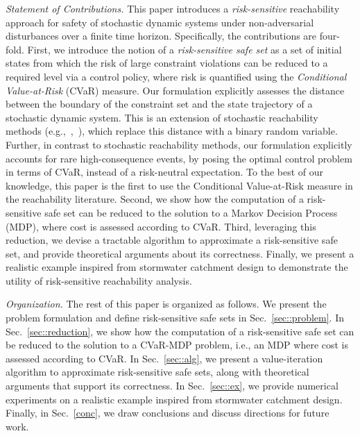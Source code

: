 \documentclass[letterpaper, 10 pt, conference]{ieeeconf}  %
\begin{document}
{\em Statement of Contributions.} This paper introduces a {\em risk-sensitive} reachability approach for safety of stochastic dynamic systems under non-adversarial disturbances
over a finite time horizon. Specifically, the contributions are four-fold. 
First, we introduce the notion of a \textit{risk-sensitive safe set} as a set of initial states 
from which the risk of large constraint violations can be reduced to a required level via a control policy, 
where risk is quantified using the \textit{Conditional Value-at-Risk} (CVaR) measure. 
Our formulation explicitly assesses the distance between the boundary of the constraint set and the
state trajectory of a stochastic dynamic system. This is an extension of stochastic 
reachability methods (e.g.,~\cite{abate2008probabilistic},~\cite{summers2010verification}), which replace this distance with a binary random variable.
Further, in contrast to stochastic reachability methods, our formulation explicitly accounts for rare high-consequence events, by posing the optimal control problem
in terms of CVaR, instead of a risk-neutral expectation. 
To the best of our knowledge, this paper is the first to use the Conditional Value-at-Risk measure in the reachability literature.
Second, we show how the computation of a risk-sensitive safe set can be reduced to the solution to a Markov Decision Process (MDP), 
where cost is assessed according to CVaR. Third, leveraging this reduction, we devise a tractable algorithm to approximate a risk-sensitive safe set, 
and provide theoretical arguments about its correctness. 
Finally, we present a realistic
example inspired from stormwater catchment design to demonstrate the utility of risk-sensitive reachability analysis.

{\em Organization.} The rest of this paper is organized as follows. We present the problem formulation and define risk-sensitive safe sets in Sec.~\ref{sec::problem}. 
In Sec.~\ref{sec::reduction}, we show how the computation of a risk-sensitive safe set can be reduced to the solution to a CVaR-MDP problem, 
i.e., an MDP where cost is assessed according to CVaR. 
In Sec.~\ref{sec::alg}, we present a value-iteration algorithm to approximate risk-sensitive safe sets, along with theoretical arguments that support its correctness. 
In Sec.~\ref{sec::ex}, we provide numerical experiments on a realistic example inspired from stormwater catchment design. 
Finally, in Sec.~\ref{conc}, we draw conclusions and discuss directions for future work.
%
\end{document}
